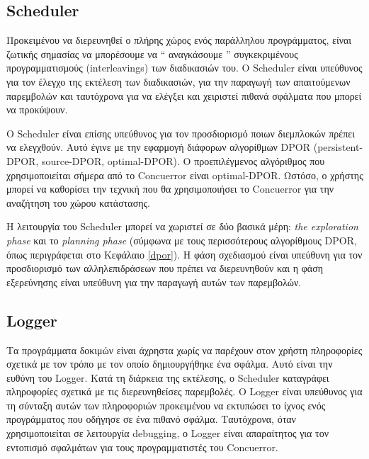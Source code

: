 \subsection{Scheduler}

Προκειμένου να διερευνηθεί ο πλήρης χώρος ενός παράλληλου προγράμματος, είναι ζωτικής σημασίας να μπορέσουμε να
`` αναγκάσουμε '' συγκεκριμένους προγραμματισμούς (interleavings) των διαδικασιών του. Ο Scheduler είναι υπεύθυνος για τον έλεγχο
της εκτέλεση των διαδικασιών, για την παραγωγή των απαιτούμενων παρεμβολών και ταυτόχρονα
για να ελέγξει και χειριστεί πιθανά σφάλματα που μπορεί να προκύψουν.

Ο Scheduler είναι επίσης υπεύθυνος για τον προσδιορισμό ποιων διεμπλοκών πρέπει να ελεγχθούν. Αυτό έγινε
με την εφαρμογή διάφορων αλγορίθμων DPOR (persistent-DPOR, source-DPOR, optimal-DPOR). Ο προεπιλέγμενος
αλγόριθμος που χρησιμοποιείται σήμερα από το Concuerror είναι optimal-DPOR.
Ωστόσο, ο χρήστης μπορεί να καθορίσει την τεχνική που θα χρησιμοποιήσει το Concuerror για την αναζήτηση του χώρου κατάστασης.

Η λειτουργία του Scheduler μπορεί να χωριστεί σε δύο βασικά μέρη: \textit{the exploration phase} και
το \textit{planning phase} (σύμφωνα με τους περισσότερους αλγορίθμους DPOR, όπως περιγράφεται στο Κεφάλαιο \ref{dpor}).
Η φάση σχεδιασμού είναι υπεύθυνη για τον προσδιορισμό των αλληλεπιδράσεων που πρέπει να διερευνηθούν και η
φάση εξερεύνησης είναι υπεύθυνη για την παραγωγή αυτών των παρεμβολών.

\subsection{Logger}

Τα προγράμματα δοκιμών είναι άχρηστα χωρίς να παρέχουν στον χρήστη πληροφορίες σχετικά με τον τρόπο με τον οποίο δημιουργήθηκε ένα σφάλμα. Αυτό είναι
την ευθύνη του Logger. Κατά τη διάρκεια της εκτέλεσης, ο Scheduler καταγράφει πληροφορίες σχετικά με τις διερευνηθείσες παρεμβολές.
Ο Logger είναι υπεύθυνος για τη σύνταξη αυτών των πληροφοριών προκειμένου να εκτυπώσει το ίχνος ενός προγράμματος που οδήγησε σε ένα
πιθανό σφάλμα. Ταυτόχρονα, όταν χρησιμοποιείται σε λειτουργία debugging, ο Logger είναι απαραίτητος για τον εντοπισμό σφαλμάτων για τους προγραμματιστές του Concuerror.

